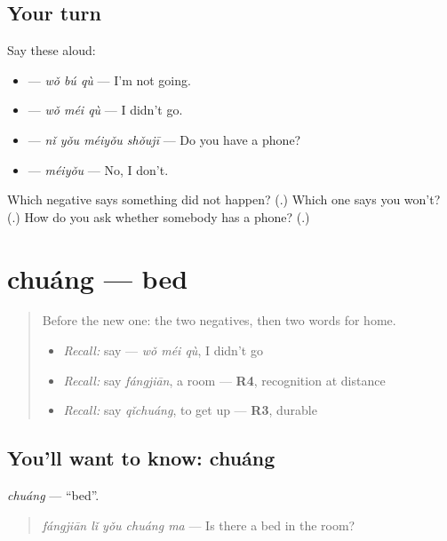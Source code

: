 \subsection*{Your turn}
Say these aloud:

\begin{itemize}
\raggedright
  \item {} — \emph{wǒ bú qù} — I'm not going.
  \item {} — \emph{wǒ méi qù} — I didn't go.
  \item {} — \emph{nǐ yǒu méiyǒu shǒujī} — Do you have a phone?
  \item {} — \emph{méiyǒu} — No, I don't.
\end{itemize}

\begin{tcolorbox}[breakable,colback=teal!4,colframe=teal!35!black,title={Before you move on}]
Which negative says something did not happen? (\textbf{}.) Which one says you won't? (\textbf{}.) How do you ask whether somebody has a phone? (\textbf{}.)
\end{tcolorbox}
\section[chuáng]{chuáng — bed}

\label{lesson:ZH-C87-chuang}



\begin{quote}
Before the new one: the two negatives, then two words for home.

\begin{itemize}
\raggedright
  \item \emph{Recall:} say  — \emph{wǒ méi qù}, I didn't go
  \item \emph{Recall:} say \emph{fángjiān}, a room — \textbf{R4}, recognition at distance
  \item \emph{Recall:} say \emph{qǐchuáng}, to get up — \textbf{R3}, durable
\end{itemize}
\end{quote}

\subsection*{You'll want to know: chuáng}
\emph{chuáng} — \textquotedblleft{}bed\textquotedblright{}.

\begin{quote}
\emph{fángjiān lǐ yǒu chuáng ma} — Is there a bed in the room?
\end{quote}

